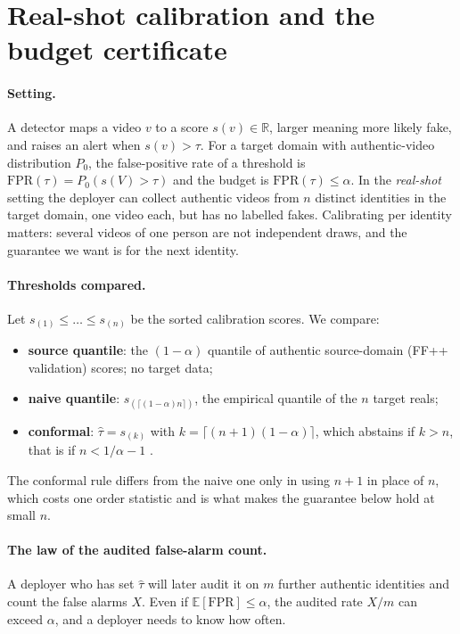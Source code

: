 \section{Real-shot calibration and the budget certificate}
\label{sec:cert}

\paragraph{Setting.}
A detector maps a video $v$ to a score $s(v)\in\mathbb{R}$, larger meaning more likely fake, and raises an alert when $s(v)>\tau$. For a target domain with authentic-video distribution $P_0$, the false-positive rate of a threshold is $\mathrm{FPR}(\tau)=P_0(s(V)>\tau)$ and the budget is $\mathrm{FPR}(\tau)\le\alpha$. In the \emph{real-shot} setting the deployer can collect authentic videos from $n$ distinct identities in the target domain, one video each, but has no labelled fakes. Calibrating per identity matters: several videos of one person are not independent draws, and the guarantee we want is for the next identity.

\paragraph{Thresholds compared.}
Let $s_{(1)}\le\dots\le s_{(n)}$ be the sorted calibration scores. We compare:
\begin{itemize}[leftmargin=*,itemsep=1pt]
    \item \textbf{source quantile}: the $(1-\alpha)$ quantile of authentic source-domain (FF++ validation) scores; no target data;
    \item \textbf{naive quantile}: $s_{(\lceil(1-\alpha)n\rceil)}$, the empirical quantile of the $n$ target reals;
    \item \textbf{conformal}: $\hat\tau=s_{(k)}$ with $k=\lceil(n+1)(1-\alpha)\rceil$, which abstains if $k>n$, that is if $n<1/\alpha-1$ \citep{vovk2012conditional,angelopoulos2023gentle}.
\end{itemize}
The conformal rule differs from the naive one only in using $n+1$ in place of $n$, which costs one order statistic and is what makes the guarantee below hold at small $n$.

\paragraph{The law of the audited false-alarm count.}
A deployer who has set $\hat\tau$ will later audit it on $m$ further authentic identities and count the false alarms $X$. Even if $\mathbb{E}[\mathrm{FPR}]\le\alpha$, the audited rate $X/m$ can exceed $\alpha$, and a deployer needs to know how often.

